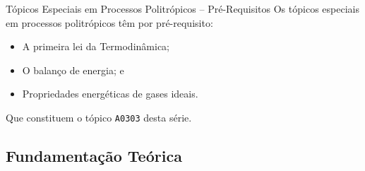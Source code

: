     \begin{frame}{Tópicos Especiais em Processos Politrópicos -- Pré-Requisitos}\vspace*{-2em}
        Os tópicos especiais em processos politrópicos têm por pré-requisito:
        \begin{itemize}
            \item A \alert{primeira lei da Termodinâmica}; \\[\medskipamount]
            \item O \alert{balanço de energia}; e \\[\medskipamount]
            \item \alert{Propriedades energéticas} de gases ideais. \\[\bigskipamount]
        \end{itemize}
        Que constituem o tópico \texttt{A0303} desta série.
    \end{frame}

\subsection{Fundamentação Teórica}

